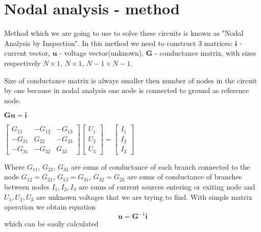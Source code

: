 \documentclass[notitlepage, a4paper, 11pt]{article}
\begin{document}
	\section{Nodal analysis - method}\label{sec:Nodal analysis}
	Method which we are going to use to solve these circuits is known as "Nodal Analysis by Inspection". In this method we need to construct 3 matrices: $\mathbf{i}$ - current vector, $\mathbf{u}$ - voltage vector(unknown), $\mathbf{G}$ - conductance matrix, with sizes respectively $\mathit{N} \times 1$, $\mathit{N} \times 1$, $\mathit{N}-1 \times \mathit{N}-1$.
	
	Size of conductance matrix is always smaller then number of nodes in the circuit by one because in nodal analysis one node is connected to ground as reference node.

		\begin{center} $\mathbf{Gu=i}$ \end{center}
		\begin{center}
			\begin{math}
				\begin{bmatrix}
					G_{11} & -G_{12} & -G_{13} \\
					-G_{21} & G_{22} & -G_{23} \\
					-G_{31} & -G_{32} & G_{33} 
				\end{bmatrix}
				\begin{bmatrix}
					U_1 \\
					U_2 \\ 
					U_3
				\end{bmatrix}
				=
				\begin{bmatrix}
					I_1 \\
					I_2 \\
					I_3
				\end{bmatrix}
			\end{math}
		\end{center}
		Where $G_{11}$, $G_{22}$, $G_{33}$ are sums of conductance of each branch connected to the node \newline $G_{12} = G_{21}$, $G_{13} = G_{31}$, $G_{32} = G_{23}$ are sums of conductance of branches between nodes \newline $I_1, I_2, I_3$ are sums of current sources entering or exiting node and $U_1, U_2, U_3$ are unknown voltages that we are trying to find.
		\newline\newline
		With simple matrix operation we obtain equation
		$$
		\mathbf{u} = \mathbf{G}^{-1}\mathbf{i}
		$$
		which can be easily calculated
\end{document}
